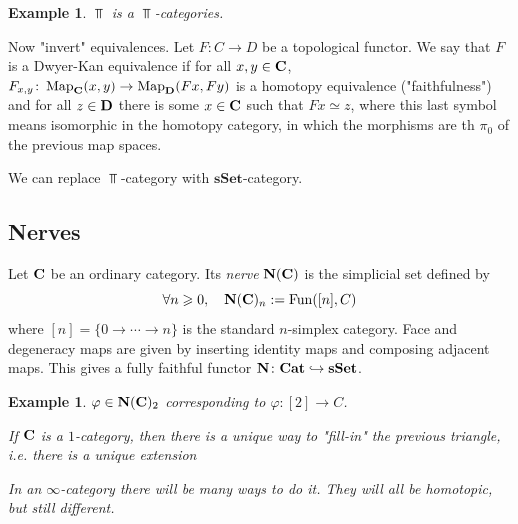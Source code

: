 \documentclass[A4paper, british]{amsart}
\theoremstyle{darkgreentheorem}
\theoremstyle{darkbluedefinition}
\theoremstyle{darkredexample}
\newtheorem{exa}[thm]{Example}
\theoremstyle{remark}
\DeclareMathOperator{\Sing}{Sing}
\DeclareMathOperator{\Fun}{Fun}
\DeclareMathOperator{\Map}{Map}
\DeclareMathOperator{\ho}{ho}
\newcommand{\sSet}{\mathbf{sSet}}
\newcommand{\1}{\mathbbm{1}}
\begin{document}
\begin{exa}
    $\Top$ is a $\Top$-categories.
\end{exa}

Now "invert" equivalences.
Let $F\colon C\to D$ be a topological functor.
We say that $F$ is a Dwyer-Kan equivalence if for all $x,y\in \mathbf{C}$, $F_{x,y}\colon \Map_{\bfC}(x,y)\to \Map_{\D}(Fx,Fy)$ is a homotopy equivalence ("faithfulness") and for all $z\in \mathbf{D}$ there is some $x\in \mathbf{C}$ such that $Fx\simeq z$, where this last symbol means isomorphic in the homotopy category, in which the morphisms are th $\pi_{0}$ of the previous map spaces.

\begin{center}
\end{center}

We can replace $\Top$-category with $\sSet$-category.

\subsection{Nerves}

Let $\mathbf{C}$ be an ordinary category.
Its \textit{nerve} $\mathbf{N}(\mathbf{C})$ is the simplicial set defined by
\[ \forall n\geqslant 0, \quad \bfN(\bfC)_{n}:=\Fun([n],C) \]
where $[n]=\{0\to \cdots \to n\}$ is the standard $n$-simplex category.
Face and degeneracy maps are given by inserting identity maps and composing adjacent maps.
This gives a fully faithful functor $\bfN\colon \Cat\hookrightarrow \sSet$.

\begin{exa}
    $\varphi\in \mathbf{N}(\mathbf{C})_{2}$ corresponding to $\varphi \colon [2]\to C$.
    \begin{center}
    \end{center}
    If $\mathbf{C}$ is a $1$-category, then there is a unique way to "fill-in" the previous triangle, i.e. there is a unique extension
    \begin{center}
    \end{center}
    In an $\infty$-category there will be many ways to do it.
    They will all be homotopic, but still different.
\end{exa}
\end{document}
